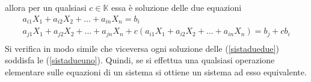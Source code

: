 \documentclass{article}
\theoremstyle{plain}
\theoremstyle{definition}
\theoremstyle{remark}
\begin{document}
allora per un qualsiasi \( c \in \mathbb{K} \) essa è soluzione delle due equazioni
\begin{equation}
    \begin{matrix}
        a_{i1}X_1 + a_{i2}X_2 + \ldots + a_{in}X_n = b_i\\
        a_{j1}X_1 + a_{j2}X_2 + \ldots + a_{jn}X_n +c(a_{i1}X_1 + a_{i2}X_2 + \ldots + a_{in}X_n)= b_j+cb_i\\
    \end{matrix}\label{sistaduedue}
\end{equation}
Si verifica in modo simile che viceversa ogni soluzione delle (\ref{sistaduedue}) soddisfa le (\ref{sistadueuno}).
Quindi, se si effettua una qualsiasi operazione elementare sulle equazioni di un sistema si ottiene un sistema ad esso equivalente.

\vspace{10pt}
\end{document}

